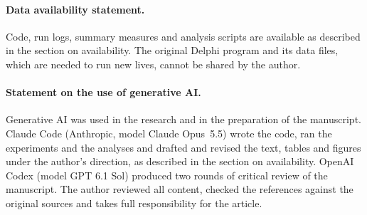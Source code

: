 \documentclass[11pt,a4paper]{article}
\begin{document}
\paragraph{Data availability statement.} Code, run logs, summary measures and analysis scripts are available as described in the section on availability. The original Delphi program and its data files, which are needed to run new lives, cannot be shared by the author.

\paragraph{Statement on the use of generative AI.} Generative AI was used in the research and in the preparation of the manuscript. Claude Code (Anthropic, model Claude Opus~5.5) wrote the code, ran the experiments and the analyses and drafted and revised the text, tables and figures under the author's direction, as described in the section on availability. OpenAI Codex (model GPT 6.1 Sol) produced two rounds of critical review of the manuscript. The author reviewed all content, checked the references against the original sources and takes full responsibility for the article.



\end{document}
